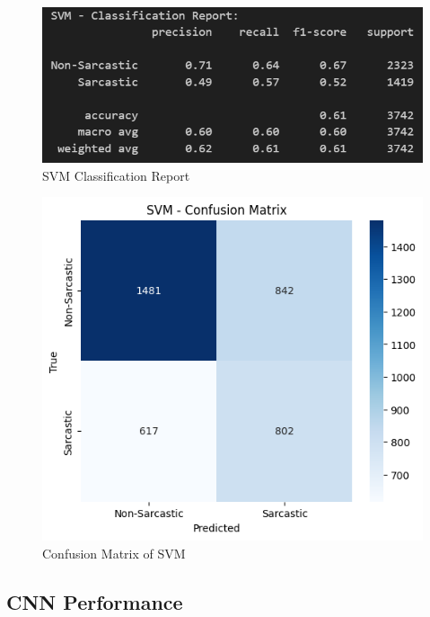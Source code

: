 \documentclass[11pt]{article}
\begin{document}
\begin{figure}[htbp]
    \centering
    \includegraphics[width=.8\linewidth]{pic/SVM-Report.png}
    \caption{SVM Classification Report}
    \label{fig:svmcr}
\end{figure}
\begin{figure}[htbp]
    \centering
    \includegraphics[width=.8\linewidth]{pic/SVM-Matrix.png}
    \caption{Confusion Matrix of SVM}
    \label{fig:svmcm}
\end{figure}

\subsection{CNN Performance}
\end{document}
